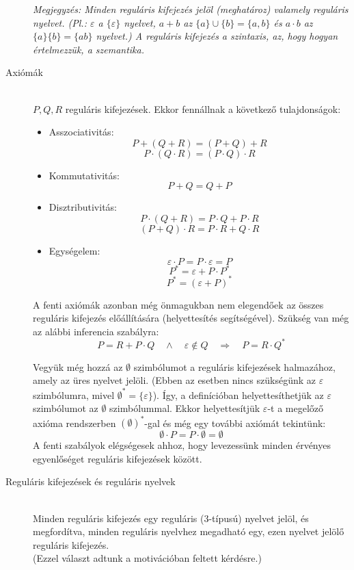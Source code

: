 \documentclass[margin=0px]{article}
\begin{document}
\begin{description}
        \textit{Megjegyzés: Minden reguláris kifejezés jelöl (meghatároz) valamely reguláris nyelvet. (Pl.: $\varepsilon$ a $\{\varepsilon\}$ nyelvet, $a+b$ az $\{a\} \cup \{b\} = \{a,b\}$ és $a\cdot b$ az $\{a\}\{b\} = \{ab\}$ nyelvet.) A reguláris kifejezés a szintaxis, az, hogy hogyan értelmezzük, a szemantika.}
        \item[Axiómák]\hfill \\
        $P,Q,R$ reguláris kifejezések. Ekkor fennállnak a következő tulajdonságok:
        \begin{itemize}
            \item Asszociativitás:
                  \[P+(Q+R) = (P+Q)+R\]
                  \[P\cdot(Q\cdot R) = (P\cdot Q)\cdot R\]
            \item Kommutativitás:
                  \[P+Q = Q+P\]
            \item Disztributivitás:
                  \[P\cdot (Q+R) = P\cdot Q + P\cdot R\]
                  \[(P+Q)\cdot R = P\cdot R + Q\cdot R\]
            \item Egységelem:
                  \[\varepsilon\cdot P = P\cdot\varepsilon = P\]
                  \[P^* = \varepsilon + P \cdot P^*\]
                  \[P^* = (\varepsilon+P)^*\]
        \end{itemize}

        A fenti axiómák azonban még önmagukban nem elegendőek az összes reguláris kifejezés előállítására (helyettesítés segítségével). Szükség van még az alábbi inferencia szabályra:
        \[P=R+P\cdot Q \quad \land \quad \varepsilon \notin Q \quad \Longrightarrow \quad P = R\cdot Q^*\]

        Vegyük még hozzá az $\emptyset$ szimbólumot a reguláris kifejezések halmazához, amely az üres nyelvet jelöli. (Ebben az esetben nincs szükségünk az $\varepsilon$ szimbólumra, mivel $\emptyset^* = \{\varepsilon\}$). Így, a definícióban helyettesíthetjük az $\varepsilon$ szimbólumot az $\emptyset$ szimbólummal. Ekkor helyettesítjük $\varepsilon$-t a megelőző axióma rendszerben $(\emptyset)^*$-gal és még egy további
        axiómát tekintünk:
        \[\emptyset\cdot P = P\cdot\emptyset = \emptyset\]
        A fenti szabályok elégségesek ahhoz, hogy levezessünk minden érvényes egyenlőséget
        reguláris kifejezések között.
    \item[Reguláris kifejezések és reguláris nyelvek] \hfill \\
        Minden reguláris kifejezés egy reguláris (3-típusú) nyelvet jelöl, és megfordítva, minden reguláris nyelvhez megadható egy, ezen nyelvet jelölő reguláris kifejezés.\\ (Ezzel választ adtunk a motivációban feltett kérdésre.)
\end{description}
\end{document}
